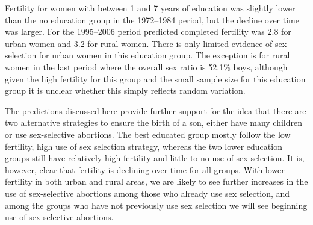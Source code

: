\documentclass[12pt,letterpaper]{article}
\begin{document}
Fertility for women with between 1 and 7 years of education was slightly lower than the 
no education group in the 1972--1984 period, but the decline over time was larger.
For the 1995--2006 period predicted completed fertility was 2.8 for urban women and
3.2 for rural women.
There is only limited evidence of sex selection for urban women in this education group.
The exception is for rural women in the last period where the overall sex ratio is
52.1\% boys, although given the high fertility for this group and the small sample
size for this education group it is unclear whether this simply reflects random variation.

% 

The predictions discussed here provide further support for the idea that there are 
two alternative strategies to ensure the birth of a son, either have many children 
or use sex-selective abortions.
The best educated group mostly follow the low fertility, high use of sex selection
strategy, whereas the two lower education groups still have relatively high fertility
and little to no use of sex selection.
It is, however, clear that fertility is declining over time for all groups.
With lower fertility in both urban and rural areas, we are likely to see 
further increases in the use of sex-selective abortions among those who already
use sex selection, and among the groups who have not previously use sex selection
we will see beginning use of sex-selective abortions.

% 
% 
% 
\end{document}
